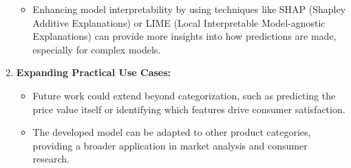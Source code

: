 \documentclass[12pt]{report}
\begin{document}
\begin{enumerate}
	      \begin{itemize}
		      \setlength\itemsep{-1.5em}
		      \item Enhancing model interpretability by using techniques like SHAP (Shapley Additive Explanations) or LIME (Local Interpretable Model-agnostic Explanations) can provide more insights into how predictions are made, especially for complex models.
	      \end{itemize}
	\item{\textbf{Expanding Practical Use Cases:	}}
	      \vspace{-1.65em}
	      \begin{itemize}
		      \setlength\itemsep{-1.5em}
		      \item Future work could extend beyond categorization, such as predicting the price value itself or identifying which features drive consumer satisfaction.
		      \item The developed model can be adapted to other product categories, providing a broader application in market analysis and consumer research.
	      \end{itemize}
\end{enumerate}
\end{document}
